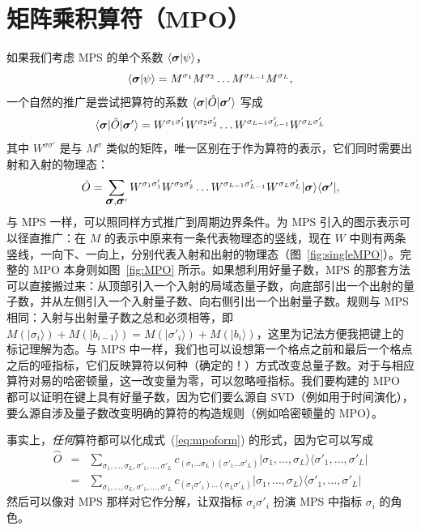 \documentclass[a4paper,10pt,oneside,onecolumn,1p,times]{elsarticle}
\newcommand{\bra}[1]{\mbox{$\langle #1  |$}}
\newcommand{\ket}[1]{\mbox{$| #1  \rangle$}}
\newcommand{\braket}[2]{\mbox{$\langle #1  | #2 \rangle$}} 	%
\newcommand{\fat}[1]{\mbox{\boldmath$#1$\unboldmath}}	%
\begin{document}
\section{矩阵乘积算符（MPO）}
\label{sec:MPO}
如果我们考虑 MPS 的单个系数 $\braket{\fat{\sigma}}{\psi}$，
\[
\braket{\fat{\sigma}}{\psi} = M^{\sigma_1}M^{\sigma_2}\ldots M^{\sigma_{L-1}}M^{\sigma_L},
\]
一个自然的推广是尝试把算符的系数 $\bra{\fat{\sigma}} \hat{O} \ket{\fat{\sigma}'}$ 写成 \cite{VerstraeteRipoll04,McCulloch07,VerstraetePirvu08,Crosswhite08,Frowis10}
\begin{equation}
\bra{\fat{\sigma}} \hat{O} \ket{\fat{\sigma}'} = W^{\sigma_1\sigma'_1}W^{\sigma_2\sigma'_2} \ldots
W^{\sigma_{L-1}\sigma'_{L-1}}W^{\sigma_L\sigma'_L}
\end{equation}
其中 $W^{\sigma\sigma'}$ 是与 $M^{\sigma}$ 类似的矩阵，唯一区别在于作为算符的表示，它们同时需要出射和入射的物理态：
\begin{equation}
\hat{O} = \sum_{\fat{\sigma},\fat{\sigma}'} W^{\sigma_1\sigma'_1}W^{\sigma_2\sigma'_2} \ldots
W^{\sigma_{L-1}\sigma'_{L-1}}W^{\sigma_L\sigma'_L} \ket{\fat{\sigma}}\bra{\fat{\sigma}'} ,
\label{eq:mpoform}
\end{equation}
与 MPS 一样，可以照同样方式推广到周期边界条件。为 MPS 引入的图示表示可以径直推广：在 $M$ 的表示中原来有一条代表物理态的竖线，现在 $W$ 中则有两条竖线，一向下、一向上，分别代表入射和出射的物理态（图~\ref{fig:singleMPO}）。完整的 MPO 本身则如图~\ref{fig:MPO} 所示。如果想利用好量子数，MPS 的那套方法可以直接搬过来：从顶部引入一个入射的局域态量子数，向底部引出一个出射的量子数，并从左侧引入一个入射量子数、向右侧引出一个出射量子数。规则与 MPS 相同：入射与出射量子数之总和必须相等，即 $M(\ket{\sigma_i}) + M(\ket{b_{i-1}}) = M(\ket{\sigma'_i}) + M(\ket{b_{i}})$，这里为记法方便我把键上的标记理解为态。与 MPS 中一样，我们也可以设想第一个格点之前和最后一个格点之后的哑指标，它们反映算符以何种（确定的！）方式改变总量子数。对于与相应算符对易的哈密顿量，这一改变量为零，可以忽略哑指标。我们要构建的 MPO 都可以证明在键上具有好量子数，因为它们要么源自 SVD（例如用于时间演化），要么源自涉及量子数改变明确的算符的构造规则（例如哈密顿量的 MPO）。

事实上，{\em 任何}算符都可以化成式~(\ref{eq:mpoform}) 的形式，因为它可以写成
\begin{eqnarray}
\hat{O} &=& \sum_{\sigma_1,\ldots,\sigma_L,\sigma'_1,\ldots,\sigma'_L} c_{(\sigma_1\ldots\sigma_L)(\sigma'_1\ldots\sigma'_L)} \ket{\sigma_1,\ldots,\sigma_L} \bra{\sigma'_1,\ldots,\sigma'_L}  \nonumber \\ 
&=& \sum_{\sigma_1,\ldots,\sigma_L,\sigma'_1,\ldots,\sigma'_L} c_{(\sigma_1\sigma'_1) \ldots (\sigma_L \sigma'_L)} \ket{\sigma_1,\ldots,\sigma_L} \bra{\sigma'_1,\ldots,\sigma'_L}
\end{eqnarray}
然后可以像对 MPS 那样对它作分解，让双指标 $\sigma_i \sigma'_i$ 扮演 MPS 中指标 $\sigma_i$ 的角色。
\end{document}
